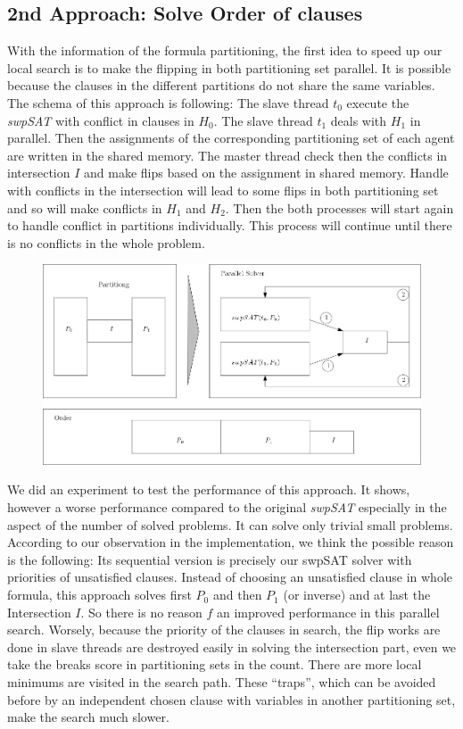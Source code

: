 \documentclass[12pt,a4paper,twoside]{scrartcl}
\numberwithin{equation}{section}
\begin{document}
\subsection{2nd Approach: Solve Order of clauses}
\label{sec:2nd}
With the information of the formula partitioning, the first idea to speed up our local search is to make the flipping in both partitioning set parallel. It is possible because the clauses in the different partitions do not share the same variables. The schema of this approach is following: The slave thread $t_0$ execute the \emph{swpSAT} with  conflict in clauses in $H_0$. The slave thread $t_1$ deals with $H_1$ in parallel.  Then the assignments of the corresponding partitioning set of each agent are written in the shared memory. The master thread check then the conflicts in intersection $I$ and make flips based on the assignment in shared memory.  Handle with conflicts in the intersection will lead to some flips in both partitioning set and so will make conflicts in $H_1$ and $H_2$. Then the both processes will start again to handle conflict in partitions individually. This process will continue until there is no conflicts in the whole problem.
\begin{figure}[H]
\begin{center}
  \includegraphics[scale = 0.3]{1/a2.png}
  \end{center}
  \label{a2}
  \end{figure}
We did an experiment to test the performance of this approach. It shows, however a worse performance compared to the original \emph{swpSAT} especially in the aspect of the number of solved problems. It can solve only trivial small problems. According to our observation in the implementation, we think the possible reason is the following: Its sequential version is precisely our swpSAT solver with priorities of unsatisfied clauses. Instead of choosing an unsatisfied clause in whole formula, this approach solves first $P_0$ and then $P_1$ (or inverse) and at last the Intersection $I$. So there is no reason $f$ an improved performance in this parallel search. Worsely, because the priority of the clauses in search, the flip works are done in slave threads are destroyed easily in solving the intersection part, even we take the breaks score in partitioning sets in the count. There are more local minimums are visited in the search path. These  ``traps'', which can be avoided before by an independent chosen clause with variables in another partitioning set, make the search much slower.
\end{document}
